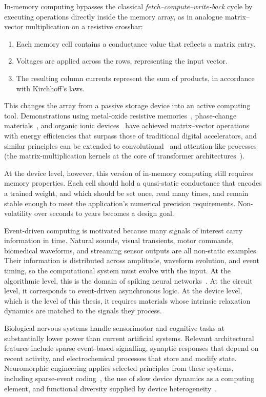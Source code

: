 \documentclass[12pt, twoside]{report}
\begin{document}
In-memory computing bypasses the classical \textit{fetch--compute--write-back} cycle by executing operations directly inside the memory array, as in analogue matrix--vector multiplication on a resistive crossbar:
\begin{enumerate}
  \item Each memory cell contains a conductance value that reflects a matrix entry.
  \item Voltages are applied across the rows, representing the input vector.
  \item The resulting column currents represent the sum of products, in accordance with Kirchhoff's laws.
\end{enumerate} This changes the array from a passive storage device into an active computing tool. Demonstrations using metal-oxide resistive memories~\cite{Prezioso2015}, phase-change materials~\cite{Koelmans2015, Sebastian2014}, and organic ionic devices~\cite{Fuller2019, VanDeBurgt2017, VanDeBurgt2018} have achieved matrix--vector operations with energy efficiencies that surpass those of traditional digital accelerators, and similar principles can be extended to convolutional~\cite{Yao2020} and attention-like processes (the matrix-multiplication kernels at the core of transformer architectures~\cite{Vaswani2017}).

At the device level, however, this version of in-memory computing still requires memory properties. Each cell should hold a quasi-static conductance that encodes a trained weight, and which should be set once, read many times, and remain stable enough to meet the application's numerical precision requirements. Non-volatility over seconds to years becomes a design goal.

Event-driven computing is motivated because many signals of interest carry information in time. Natural sounds, visual transients, motor commands, biomedical waveforms, and streaming sensor outputs are all non-static examples. Their information is distributed across amplitude, waveform evolution, and event timing, so the computational system must evolve with the input. At the algorithmic level, this is the domain of spiking neural networks~\cite{Roy2019}. At the circuit level, it corresponds to event-driven asynchronous logic. At the device level, which is the level of this thesis, it requires materials whose intrinsic relaxation dynamics are matched to the signals they process.

Biological nervous systems handle sensorimotor and cognitive tasks at substantially lower power than current artificial systems. Relevant architectural features include sparse event-based signalling, synaptic responses that depend on recent activity, and electrochemical processes that store and modify state. Neuromorphic engineering applies selected principles from these systems, including sparse-event coding~\cite{IndiveriLiu2015}, the use of slow device dynamics as a computing element, and functional diversity supplied by device heterogeneity~\cite{Mead1990}.
\end{document}
